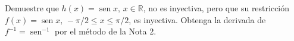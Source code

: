 \item Demuestre que $h(x) = \operatorname{sen} x, \, x \in \mathbb{R}$, no es inyectiva, pero que su restricción $f(x) = \operatorname{sen} x, \, -\pi/2 \le x \le \pi/2$, es inyectiva. Obtenga la derivada de $f^{-1} = \operatorname{sen}^{-1}$ por el método de la Nota 2.
